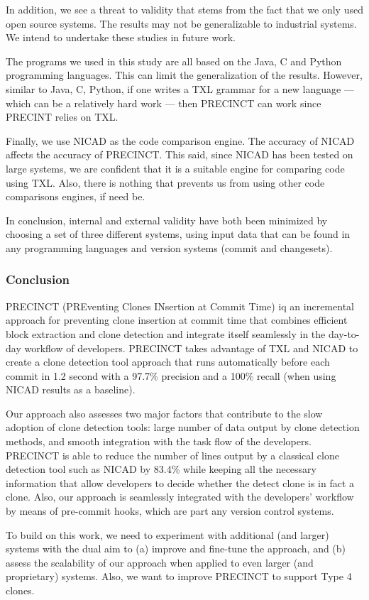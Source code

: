 In addition, we see a threat to validity that stems from the fact that we only used open source systems. The results may not be generalizable to industrial systems. We intend to undertake these studies in future work.

The programs we used in this study are all based on the Java, C and Python programming languages. This can limit the generalization of the results. However, similar to Java, C, Python, if one writes a TXL grammar for a new language --- which can be a relatively hard work --- then PRECINCT can work since PRECINT relies on TXL.

Finally, we use NICAD as the code comparison engine. The accuracy of NICAD affects the accuracy of PRECINCT. This said, since NICAD has been tested on large systems, we are confident that it is a suitable engine for comparing code using TXL. Also, there is nothing that prevents us from using other code comparisons engines, if need be.

In conclusion, internal and external validity have both been minimized by choosing a set of three different systems, using input data that can be found in any programming languages and version systems (commit and changesets).


\subsubsection{Conclusion}
\label{sec:Conclusion}

PRECINCT (PREventing Clones INsertion at Commit Time) iq an incremental approach for preventing clone insertion at commit time that combines efficient block extraction and clone detection and integrate itself seamlessly in the day-to-day workflow of developers.
PRECINCT takes advantage of TXL and NICAD to create a clone detection tool approach that runs automatically before each commit in 1.2 second with a 97.7\% precision and a 100\% recall (when using NICAD results as a baseline).

Our approach also assesses two major factors that contribute to the slow adoption of clone detection tools: large number of data output by clone detection methods,  and  smooth integration with the task flow of the developers.
PRECINCT is able to reduce the number of lines output by a classical clone detection tool such as NICAD by 83.4\% while keeping all the necessary information that allow developers to decide whether the detect clone is in fact a clone.
Also, our approach is seamlessly integrated with the developers' workflow by means of pre-commit hooks, which are part any version control systems.

To build on this work, we need to experiment with additional (and larger) systems with the dual aim to (a) improve and fine-tune the approach, and (b) assess the scalability of our approach when applied to even larger (and proprietary) systems. Also, we want to improve PRECINCT to support Type 4 clones.
